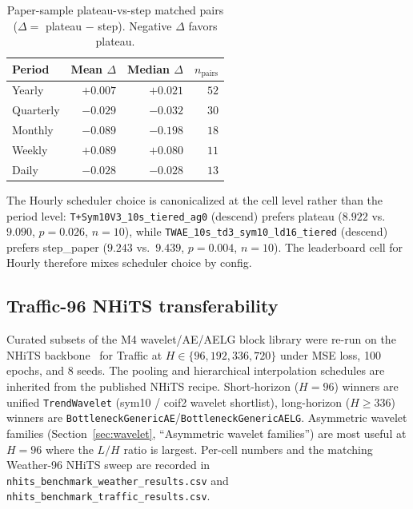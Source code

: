 \documentclass[11pt,a4paper]{article}
\begin{document}
\begin{table}[h]
\centering
\small
\caption{Paper-sample plateau-vs-step matched pairs ($\Delta = $ plateau $-$ step). Negative $\Delta$ favors plateau.}
\label{tab:lr_matched}
\begin{tabular}{@{}lrrr@{}}
\toprule
Period & Mean $\Delta$ & Median $\Delta$ & $n_\text{pairs}$ \\
\midrule
Yearly    & $+0.007$         & $+0.021$ & $52$ \\
Quarterly & $\mathbf{-0.029}$ & $-0.032$ & $30$ \\
Monthly   & $\mathbf{-0.089}$ & $-0.198$ & $18$ \\
Weekly    & $+0.089$         & $+0.080$ & $11$ \\
Daily     & $\mathbf{-0.028}$ & $-0.028$ & $13$ \\
\bottomrule
\end{tabular}
\end{table}

The Hourly scheduler choice is canonicalized at the cell level rather than the period level: \texttt{T+Sym10V3\_10s\_tiered\_ag0} (descend) prefers plateau ($8.922$ vs.\ $9.090$, $p=0.026$, $n=10$), while \texttt{TWAE\_10s\_td3\_sym10\_ld16\_tiered} (descend) prefers step\_paper ($9.243$ vs.\ $9.439$, $p=0.004$, $n=10$). The leaderboard cell for Hourly therefore mixes scheduler choice by config.

\subsection{Traffic-96 NHiTS transferability}
\label{app:ablations:nhits_traffic}

Curated subsets of the M4 wavelet/AE/AELG block library were re-run on the NHiTS backbone~\citep{challu2023nhits} for Traffic at $H \in \{96, 192, 336, 720\}$ under MSE loss, 100 epochs, and 8 seeds. The pooling and hierarchical interpolation schedules are inherited from the published NHiTS recipe. Short-horizon ($H=96$) winners are unified \texttt{TrendWavelet} (sym10 / coif2 wavelet shortlist), long-horizon ($H \geq 336$) winners are \texttt{BottleneckGenericAE}/\texttt{BottleneckGenericAELG}. Asymmetric wavelet families (Section~\ref{sec:wavelet}, ``Asymmetric wavelet families'') are most useful at $H=96$ where the $L/H$ ratio is largest. Per-cell numbers and the matching Weather-96 NHiTS sweep are recorded in \texttt{nhits\_benchmark\_weather\_results.csv} and \texttt{nhits\_benchmark\_traffic\_results.csv}.
\end{document}
